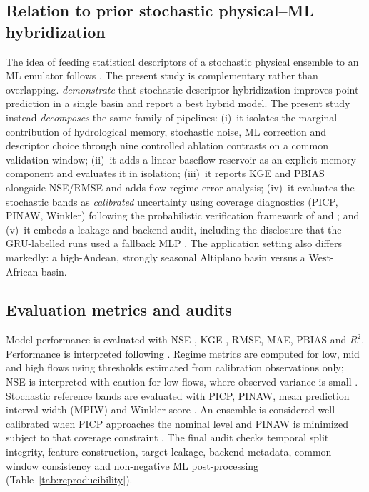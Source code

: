 \documentclass[a4paper,fleqn]{cas-sc}
\begin{document}
\subsection{Relation to prior stochastic physical--ML hybridization}
\label{subsec:relation}

The idea of feeding statistical descriptors of a stochastic physical
ensemble to an ML emulator follows \citet{houenafa2025}. The present
study is complementary rather than overlapping. \citet{houenafa2025}
\emph{demonstrate} that stochastic descriptor hybridization improves
point prediction in a single basin and report a best hybrid model. The
present study instead \emph{decomposes} the same family of pipelines:
(i)~it isolates the marginal contribution of hydrological memory,
stochastic noise, ML correction and descriptor choice through nine
controlled ablation contrasts on a common validation window; (ii)~it
adds a linear baseflow reservoir as an explicit memory component and
evaluates it in isolation; (iii)~it reports KGE and PBIAS alongside
NSE/RMSE and adds flow-regime error analysis; (iv)~it evaluates the
stochastic bands as \emph{calibrated} uncertainty using coverage
diagnostics (PICP, PINAW, Winkler) following the probabilistic
verification framework of \citet{franz2011} and \citet{abaza2017};
and (v)~it embeds a leakage-and-backend audit, including the
disclosure that the GRU-labelled runs used a fallback MLP
\citep{hall2021}. The application setting also differs markedly: a
high-Andean, strongly seasonal Altiplano basin versus a West-African
basin.

\subsection{Evaluation metrics and audits}\label{subsec:evaluation}

Model performance is evaluated with NSE \citep{nash1970nse}, KGE
\citep{gupta2009kge}, RMSE, MAE, PBIAS and $R^2$.
Performance is interpreted following \citet{moriasi2015}. Regime
metrics are computed for low, mid and high flows using thresholds
estimated from calibration observations only; NSE is interpreted
with caution for low flows, where observed variance is small
\citep{pushpalatha2012}. Stochastic reference bands are evaluated
with PICP, PINAW, mean prediction interval width (MPIW) and Winkler
score \citep{franz2011,papacharalampous2022}. An ensemble is
considered well-calibrated when PICP approaches the nominal level
and PINAW is minimized subject to that coverage constraint
\citep{atger1999,abaza2017}. The final audit checks temporal split
integrity, feature construction, target leakage, backend metadata,
common-window consistency and non-negative ML post-processing
(Table~\ref{tab:reproducibility}).
\end{document}
